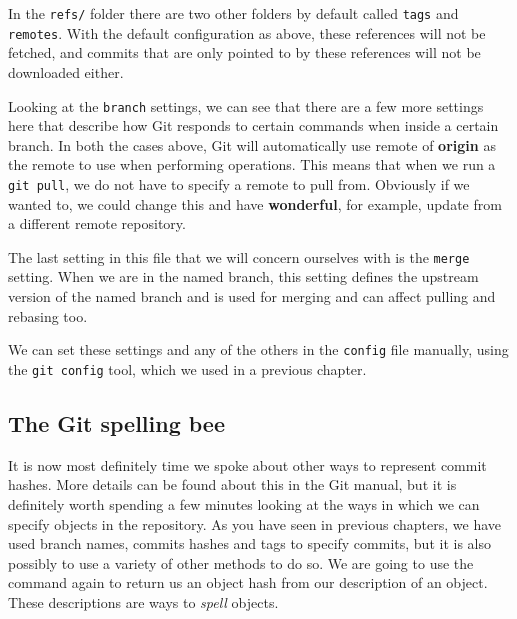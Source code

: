 In the \texttt{refs/} folder there are two other folders by default called \texttt{tags} and \texttt{remotes}.
With the default configuration as above, these references will not be fetched,
and commits that are only pointed to by these references will not be downloaded either.

Looking at the \texttt{branch} settings, we can see that there are a few more settings here that describe how Git responds to certain commands when inside a certain branch.
In both the cases above, Git will automatically use remote of \textbf{origin} as the remote to use when performing operations.
This means that when we run a \texttt{git pull}, we do not have to specify a remote to pull from.
Obviously if we wanted to, we could change this and have \textbf{wonderful}, for example, update from a different remote repository.

The last setting in this file that we will concern ourselves with is the \texttt{merge} setting.  
When we are in the named branch, this setting defines the upstream version of the named branch and is used for merging and can affect pulling and rebasing too.

We can set these settings and any of the others in the \texttt{config} file manually,
using the \texttt{git config} tool, which we used in a previous chapter.

\subsection{The Git spelling bee}
It is now most definitely time we spoke about other ways to represent commit hashes.  
More details can be found about this in the Git manual, but it is definitely worth spending a few minutes looking at the ways in which we can specify objects in the repository.
As you have seen in previous chapters, we have used branch names, commits hashes and tags to specify commits, but it is also possibly to use a variety of other methods to do so.
We are going to use the  command again to return us an object hash from our description of an object.
These descriptions are ways to \emph{spell} objects.



